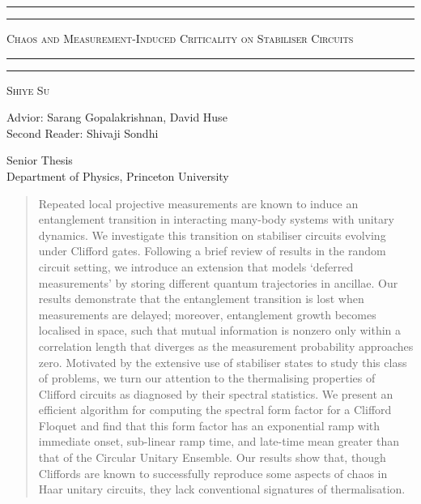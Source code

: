\documentclass[10pt]{article}
\begin{document}
{\centering

\rule{\textwidth}{1.6pt}\vspace*{-\baselineskip}\vspace*{2pt} %
\rule{\textwidth}{0.4pt} %

\huge{\textsc{Chaos and Measurement-Induced Criticality on Stabiliser Circuits}} \\


\rule{\textwidth}{0.4pt}\vspace*{-\baselineskip}\vspace{3.2pt} %
\rule{\textwidth}{1.6pt} %

\vspace{0.5cm}
\Large{\textsc{Shiye Su}}\\

\vspace{1cm}

\large{Advior: Sarang Gopalakrishnan, David Huse}\\
\large{Second Reader: Shivaji Sondhi}\\

\vspace{0.5cm}

\large{Senior Thesis\\ Department of Physics, Princeton University}\\
}

\vspace{0.5cm}


\begin{abstract}
Repeated local projective measurements are known to induce an entanglement transition in interacting many-body systems with unitary dynamics. We investigate this transition on stabiliser circuits evolving under Clifford gates. Following a brief review of results in the random circuit setting, we introduce an extension that models `deferred measurements' by storing different quantum trajectories in ancillae. Our results demonstrate that the entanglement transition is lost when measurements are delayed; moreover, entanglement growth becomes localised in space, such that mutual information is nonzero only within a correlation length that diverges as the measurement probability approaches zero. Motivated by the extensive use of stabiliser states to study this class of problems, we turn our attention to the thermalising properties of Clifford circuits as diagnosed by their spectral statistics. We present an efficient algorithm for computing the spectral form factor for a Clifford Floquet and find that this form factor has an exponential ramp with immediate onset, sub-linear ramp time, and late-time mean greater than that of the Circular Unitary Ensemble. Our results show that, though Cliffords are known to successfully reproduce some aspects of chaos in Haar unitary circuits, they lack conventional signatures of thermalisation.
\end{abstract}
\end{document}

